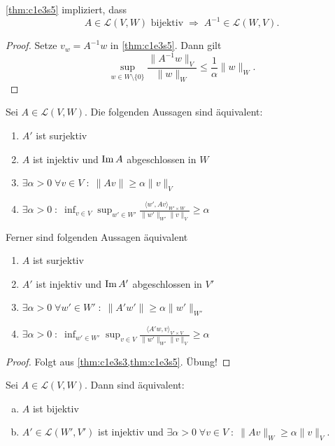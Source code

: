 \documentclass[../skript.tex]{subfiles}
\begin{document}
\begin{remark} %
\label{bem:c1e3s6}
\cref{thm:c1e3s5} impliziert, dass
\[
	A \in \mathcal{L}(V, W) \text{ bijektiv} \; \Rightarrow \; A^{-1} \in \mathcal{L}(W, V). 
\]
\end{remark}
\begin{proof}
Setze $v_w = A^{-1} w$ in \cref{thm:c1e3s5}. Dann gilt
\[
	\sup_{w \in W \setminus \{ 0 \}} \frac{\| A^{-1} w \|_V}{\| w \|_W} \leq \frac{1}{\alpha} \| w \|_W.
\]
\end{proof}
\begin{lemma} %
\label{thm:c1e3s7}
Sei $A \in \mathcal{L}(V, W)$. Die folgenden Aussagen sind äquivalent:
\begin{enumerate}
\item $A'$ ist surjektiv
\item $A$ ist injektiv und $\operatorname{Im} A$ abgeschlossen in $W$
\item $\exists \alpha > 0 \; \forall v \in V \; : \; \| A v \| \geq \alpha \| v \|_V$
\item $\exists \alpha > 0 \; : \; \inf_{v \in V} \sup_{w' \in W'} \frac{\langle w', Av \rangle_{W' \times W}}{\| w' \|_{W'} \| v \|_{V}} \geq \alpha$
\end{enumerate}
Ferner sind folgenden Aussagen äquivalent
\begin{enumerate}
\item $A$ ist surjektiv
\item $A'$ ist injektiv und $\operatorname{Im} A'$ abgeschlossen in $V'$
\item $\exists \alpha > 0 \; \forall w' \in W' \; : \; \| A' w' \| \geq \alpha \| w' \|_{W'}$
\item $\exists \alpha > 0 \; : \; \inf_{w' \in W'} \sup_{v \in V} \frac{\langle A' w, v \rangle_{V' \times V}}{\| w' \|_{W'} \| v \|_V} \geq \alpha$
\end{enumerate}
\end{lemma}
\begin{proof}
Folgt aus \cref{thm:c1e3s3,thm:c1e3s5}. Übung!
\end{proof}
\begin{theoremact} %
\label{thm:c1e3s8}
Sei $A \in \mathcal{L}(V, W)$. Dann sind äquivalent:
\begin{enumerate}[(a)]
\item $A$ ist bijektiv
\item $A' \in \mathcal{L}(W', V')$ ist injektiv und $\exists \alpha > 0 \; \forall v \in V \; : \; \| A v \|_W \geq \alpha \| v \|_V$.
\end{enumerate}
\end{theoremact}
\end{document}

